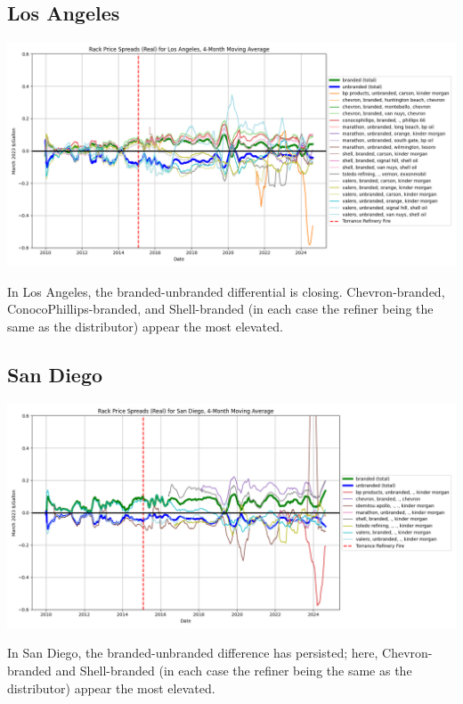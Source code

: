 \documentclass{article}
\begin{document}
\subsection{Los Angeles}
\centering \includegraphics[width=5.5in]{los angeles_spread.png}\\
\raggedright In Los Angeles, the branded-unbranded differential is closing. Chevron-branded, ConocoPhillips-branded, and Shell-branded (in each case the refiner being the same as the distributor) appear the most elevated.

\subsection{San Diego}
\centering \includegraphics[width=5.5in]{san diego_spread.png}\\
\raggedright In San Diego, the branded-unbranded difference has persisted; here, Chevron-branded and Shell-branded (in each case the refiner being the same as the distributor) appear the most elevated. 
\end{document}
